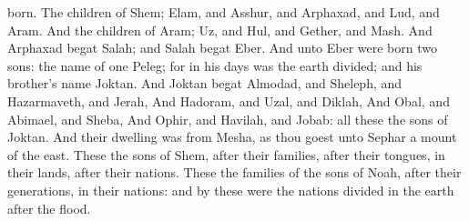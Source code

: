 {born.
The
children of
Shem;
Elam, and
Asshur, and
Arphaxad, and
Lud, and
Aram.
And the
children of
Aram;
Uz, and
Hul, and
Gether, and
Mash.
And
Arphaxad
begat
Salah; and
Salah
begat
Eber.
And unto
Eber were
born
two
sons: the
name of
one
{}
Peleg; for in his
days was the
earth
divided; and his
brother’s
name
{}
Joktan.
And
Joktan
begat
Almodad, and
Sheleph, and
Hazarmaveth, and
Jerah,
And
Hadoram, and
Uzal, and
Diklah,
And
Obal, and
Abimael, and
Sheba,
And
Ophir, and
Havilah, and
Jobab: all these
{} the
sons of
Joktan.
And their
dwelling was from
Mesha, as thou
goest unto
Sephar a
mount of the
east.
These
{} the
sons of
Shem, after their
families, after their
tongues, in their
lands, after their
nations.
These
{} the
families of the
sons of
Noah, after their
generations, in their
nations: and by these were the
nations
divided in the
earth
after the
flood.

}
